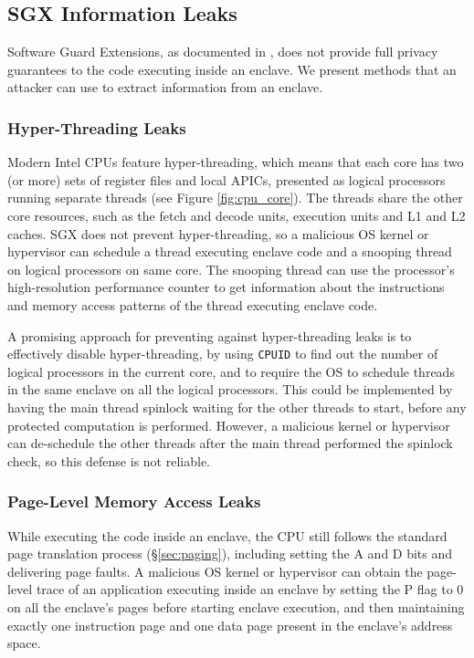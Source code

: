 \subsection{SGX Information Leaks}
\label{sec:sgx_leaks}

Software Guard Extensions, as documented in \cite{intel2015sdm}, does not
provide full privacy guarantees to the code executing inside an enclave. We
present methods that an attacker can use to extract information from an
enclave.

\subsubsection{Hyper-Threading Leaks}

Modern Intel CPUs feature hyper-threading, which means that each core has two
(or more) sets of register files and local APICs, presented as logical
processors running separate threads (see Figure \ref{fig:cpu_core}). The
threads share the other core resources, such as the fetch and decode units,
execution units and L1 and L2 caches. SGX does not prevent hyper-threading, so
a malicious OS kernel or hypervisor can schedule a thread executing enclave
code and a snooping thread on logical processors on same core. The snooping
thread can use the processor's high-resolution performance counter
\cite{petters1999making} to get information about the instructions and memory
access patterns of the thread executing enclave code.

A promising approach for preventing against hyper-threading leaks is to
effectively disable hyper-threading, by using \texttt{CPUID} to find out the
number of logical processors in the current core, and to require the OS to
schedule threads in the same enclave on all the logical processors. This could
be implemented by having the main thread spinlock waiting for the other threads
to start, before any protected computation is performed. However, a malicious
kernel or hypervisor can de-schedule the other threads after the main thread
performed the spinlock check, so this defense is not reliable.

\subsubsection{Page-Level Memory Access Leaks}

While executing the code inside an enclave, the CPU still follows the standard
page translation process (\S \ref{sec:paging}), including setting the A and D
bits and delivering page faults. A malicious OS kernel or hypervisor can
obtain the page-level trace of an application executing inside an enclave by
setting the P flag to 0 on all the enclave's pages before starting enclave
execution, and then maintaining exactly one instruction page and one data page
present in the enclave's address space.

